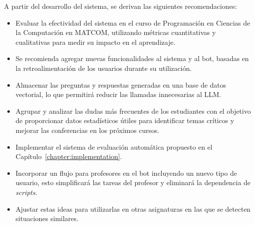 \begin{recomendations}
    A partir del desarrollo del sistema, se derivan las siguientes recomendaciones:

    \begin{itemize}
        \item Evaluar la efectividad del sistema en el curso de Programación en Ciencias de la Computación en \mbox{MATCOM}, utilizando métricas cuantitativas y cualitativas para medir su impacto en el aprendizaje.
        
        \item Se recomienda agregar nuevas funcionalidades al sistema y al bot, basadas en la retroalimentación de los usuarios durante su utilización.
        
        \item Almacenar las preguntas y respuestas generadas en una base de datos vectorial, lo que permitirá reducir las llamadas innecesarias al LLM.
    
        \item Agrupar y analizar las dudas más frecuentes de los estudiantes con el objetivo de proporcionar datos estadísticos útiles para identificar temas críticos y mejorar las conferencias en los próximos cursos.
        
        \item Implementar el sistema de evaluación automática propuesto en el Capítulo~\ref{chapter:implementation}.
        
        \item Incorporar un flujo para profesores en el bot incluyendo un nuevo tipo de usuario, esto simplificará las tareas del profesor y eliminará la dependencia de \textit{scripts}.
        
        \item Ajustar estas ideas para utilizarlas en otras asignaturas en las que se detecten
        situaciones similares.
    \end{itemize}
\end{recomendations}
